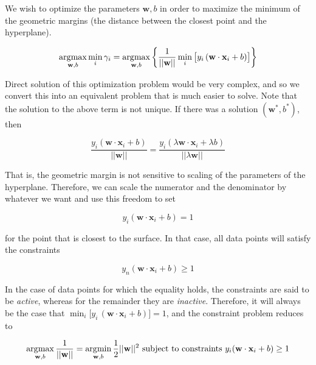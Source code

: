   We wish to optimize the parameters $\mathbf{w}, b$ in order to maximize the minimum of the geometric margins (the distance between the closest point and the hyperplane). 

  \begin{equation}
    \argmax_{\mathbf{w}, b} \min_i \gamma_i = \argmax_{\mathbf{w}, b} \bigg\{ \frac{1}{||\mathbf{w}||} \min_i \big[y_i \, (\mathbf{w} \cdot \mathbf{x}_i + b) \big] \bigg\}
  \end{equation}

  Direct solution of this optimization problem would be very complex, and so we convert this into an equivalent problem that is much easier to solve. Note that the solution to the above term is not unique. If there was a solution $(\mathbf{w}^\ast, b^\ast)$, then 

  \begin{equation}
    \frac{y_i (\mathbf{w} \cdot \mathbf{x}_i + b)}{||\mathbf{w}||} = \frac{y_i (\lambda \mathbf{w} \cdot \mathbf{x}_i + \lambda b)}{||\lambda \mathbf{w}||}  
  \end{equation}

  That is, the geometric margin is not sensitive to scaling of the parameters of the hyperplane. Therefore, we can scale the numerator and the denominator by whatever we want and use this freedom to set 

  \begin{equation*}
    y_i ( \mathbf{w} \cdot \mathbf{x}_i + b ) = 1 
  \end{equation*}
  
  for the point that is closest to the surface. In that case, all data points will satisfy the constraints 

  \begin{equation*}
    y_n (\mathbf{w} \cdot \mathbf{x}_i + b) \geq 1
  \end{equation*}

  In the case of data points for which the equality holds, the constraints are said to be \textit{active}, whereas for the remainder they are \textit{inactive}. Therefore, it will always be the case that $\min_i \big[ y_i \, (\mathbf{w} \cdot \mathbf{x}_i + b)\big] = 1$, and the constraint problem reduces to 

  \begin{equation}
    \argmax_{\mathbf{w}, b} \frac{1}{||\mathbf{w}||} = \argmin_{\mathbf{w}, b} \frac{1}{2} ||\mathbf{w}||^2 \text{ subject to constraints } y_i (\mathbf{w} \cdot \mathbf{x}_i + b) \geq 1 
  \end{equation}


